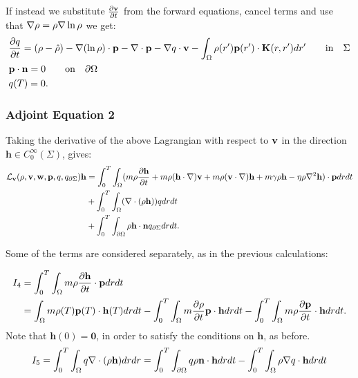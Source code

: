 If instead we substitute $\frac{\partial \mathbf{v}}{\partial t}$ from the forward equations, cancel terms and use that $\nabla \rho = \rho \nabla \ln \rho$ we get:
\begin{align*}
& \frac{\partial q}{\partial t} = (\rho - \hat {\rho}) - \nabla (\ln \rho)\cdot \mathbf{p} -\nabla\cdot \mathbf{p}  -  \nabla q \cdot \mathbf{v}  - \int_\Omega  \rho(r')\mathbf{p}(r') \cdot\mathbf{K}(r,r')   dr' \qquad \text{in} \quad \Sigma \\
& \mathbf{p} \cdot \mathbf{n} = 0 \qquad \text{on} \quad \partial \Omega\\
&q(T) = {0} .
\end{align*}

\subsubsection{Adjoint Equation 2}
Taking the derivative of the above Lagrangian with respect to $\mathbf{v}$ in the direction $\mathbf{h} \in C_0^\infty(\Sigma)$, gives:
\begin{align*}
\mathcal{L}_{\mathbf{v}}(\rho,\mathbf{v},\mathbf{w},\mathbf{p},q,{q}_{\partial \Sigma})\mathbf{h} &=  \int_0^T \int_\Omega (m \rho \frac{\partial \mathbf{h} }{\partial t} + m \rho (\mathbf{h} \cdot \nabla)\mathbf{v} + m \rho (\mathbf{v} \cdot \nabla)\mathbf{h} + m \gamma \rho \mathbf{h} - \eta \rho \nabla^2 \mathbf{h}) \cdot \mathbf{p} dr dt\\
& + \int_0^T \int_\Omega ( \nabla \cdot (\rho \mathbf{h})) q dr dt\\ 
& +\int_0^T \int_{\partial\Omega} \rho \mathbf{h} \cdot \mathbf{n} {q}_{\partial \Sigma} dr dt.
\end{align*}

Some of the terms are considered separately, as in the previous calculations:

\begin{align*}
I_4 &= \int_0^T \int_\Omega m \rho \frac{\partial \mathbf{h} }{\partial t} \cdot \mathbf{p} dr dt \\
&= \int_\Omega m \rho(T) \mathbf{p}(T) \cdot \mathbf{h}(T) dr dt - \int_0^T \int_\Omega  m\frac{\partial \rho}{\partial t} \mathbf{p} \cdot \mathbf{h} dr dt - \int_0^T \int_\Omega m \rho \frac{\partial \mathbf{p}}{\partial t} \cdot \mathbf{h} dr dt.
\end{align*}
Note that $\mathbf{h}(0)=\mathbf{0}$, in order to satisfy the conditions on $\mathbf{h}$, as before.
\begin{align*}
I_5= \int_0^T \int_\Omega q\nabla \cdot ( \rho \mathbf{h}) dr dr = \int_0^T \int_{\partial \Omega} q \rho  \mathbf{n}\cdot \mathbf{h} dr dt - \int_0^T \int_\Omega \rho\nabla q \cdot  \mathbf{h} dr dt
\end{align*}

